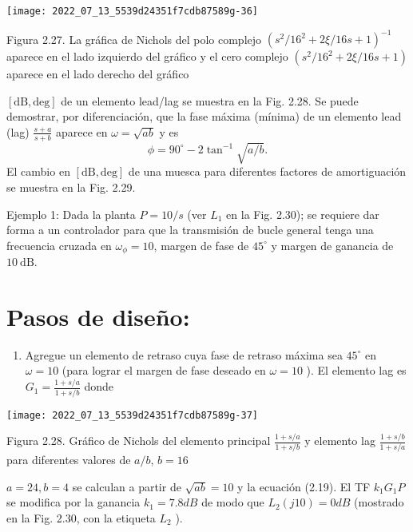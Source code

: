\texttt{[image: 2022\_07\_13\_5539d24351f7cdb87589g-36]}

Figura 2.27. La gráfica de Nichols del polo complejo $\left(s^{2} / 16^{2}+2 \xi / 16 s+1\right)^{-1}$ aparece en el lado izquierdo del gráfico y el cero complejo $\left(s^{2} / 16^{2}+2 \xi / 16 s+1\right)$ aparece en el lado derecho del gráfico

$[\mathrm{dB}, \mathrm{deg}]$ de un elemento lead/lag se muestra en la Fig. 2.28. Se puede demostrar, por diferenciación, que la fase máxima (mínima) de un elemento lead (lag) $\frac{s+a}{s+b}$ aparece en $\omega=\sqrt{a b}$ y es
$$
\phi=90^{\circ}-2 \tan ^{-1} \sqrt{a / b} .
$$
El cambio en $[\mathrm{dB}, \mathrm{deg}]$ de una muesca para diferentes factores de amortiguación se muestra en la Fig. 2.29.

Ejemplo 1: Dada la planta $P=10 / s$ (ver $L_{1}$ en la Fig. 2.30); se requiere dar forma a un controlador para que la transmisión de bucle general tenga una frecuencia cruzada en $\omega_{\phi}=10$, margen de fase de $45^{\circ}$ y margen de ganancia de $10 \mathrm{~dB}$.

\section{Pasos de diseño:}
\begin{enumerate}
  \item Agregue un elemento de retraso cuya fase de retraso máxima sea $45^{\circ}$ en $\omega=10$ (para lograr el margen de fase deseado en $\omega=10$ ). El elemento lag es $G_{1}=\frac{1+s / a}{1+s / b}$ donde
\end{enumerate}
\texttt{[image: 2022\_07\_13\_5539d24351f7cdb87589g-37]}

Figura 2.28. Gráfico de Nichols del elemento principal $\frac{1+s / a}{1+s / b}$ y elemento lag $\frac{1+s / b}{1+s / a}$ para diferentes valores de $a / b$, $b=16$

$a=24, b=4$ se calculan a partir de $\sqrt{a b}=10$ y la ecuación (2.19). El TF $k_{1} G_{1} P$ se modifica por la ganancia $k_{1}=7.8 d B$ de modo que $L_{2}(j 10)=0 d B$ (mostrado en la Fig. 2.30, con la etiqueta $L_{2}$ ).

